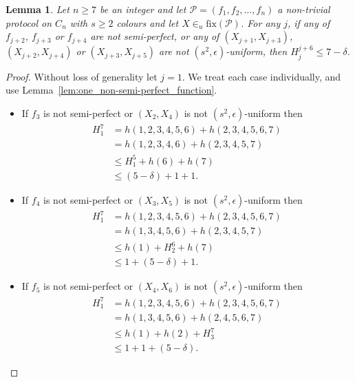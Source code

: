 \documentclass{birkjour}
\newtheorem{lem}[thm]{Lemma}
\theoremstyle{indenteddefinition}
\theoremstyle{indenteddefinition}
\numberwithin{equation}{section}
\renewcommand{\Pr}{\mathcal{P}}
\newcommand{\fix}{\mbox{fix}}
\begin{document}
\begin{lem}
\label{lem:at_least_one_non-semi-perfect_function}
Let $n \geq 7$ be an integer and let $\Pr = (f_1,f_2, \ldots ,f_n)$ a non-trivial protocol on $C_n$ with $s \geq 2$ colours and let $X\in_u \fix(\Pr)$. For any $j$, if any of $f_{j+2}$, $f_{j+3}$ or $f_{j+4}$ are not semi-perfect, or any of $(X_{j+1},X_{j+3})$, $(X_{j+2},X_{j+4})$ or $(X_{j+3},X_{j+5})$ are not $(s^2,\epsilon)$-uniform, then $H_{j}^{j+6} \leq 7 - \delta$.
\end{lem}
\begin{proof}
Without loss of generality let $j=1$. We treat each case individually, and use Lemma~\ref{lem:one_non-semi-perfect_function}.
\begin{itemize}
\item If $f_3$ is not semi-perfect or $(X_2,X_4)$ is not $(s^2,\epsilon)$-uniform then 
	\begin{align*} H_1^7 
	& = h(1,2,3,4,5,6) + h(2,3,4,5,6,7) \\
	& = h(1,2,3,4,6) + h(2,3,4,5,7) \\
	& \leq H_1^5 + h(6) + h(7) \\
	& \leq (5 - \delta) + 1 + 1.
	\end{align*}
\item If $f_4$ is not semi-perfect or $(X_3,X_5)$ is not $(s^2,\epsilon)$-uniform then 
	\begin{align*} H_1^7
	& = h(1,2,3,4,5,6) + h(2,3,4,5,6,7) \\
	& = h(1,3,4,5,6) + h(2,3,4,5,7) \\
	& \leq h(1) + H_2^6 + h(7) \\
	& \leq 1 + (5 - \delta) + 1.
	\end{align*}
\item If $f_5$ is not semi-perfect or $(X_4,X_6)$ is not $(s^2,\epsilon)$-uniform then 
	\begin{align*} H_1^7
	& = h(1,2,3,4,5,6) + h(2,3,4,5,6,7) \\
	& = h(1,3,4,5,6) + h(2,4,5,6,7) \\
	& \leq h(1) + h(2) + H_3^7 \\
	& \leq 1 + 1 + (5 - \delta).
	\end{align*}
\end{itemize}
\end{proof}
\end{document}
